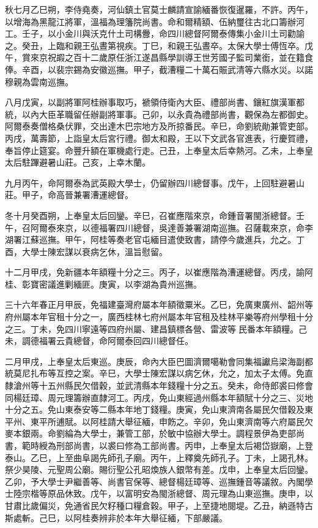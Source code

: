 \begin{pinyinscope}
秋七月乙巳朔，李侍堯奏，河仙鎮土官莫士麟請宣諭緬番恢復暹羅，不許。丙午，以增海為黑龍江將軍，溫福為理籓院尚書。命和爾精額、伍納璽往古北口籌辦河工。壬子，以小金川與沃克什土司構釁，命四川總督阿爾泰傳集小金川土司勸諭之。癸丑，上臨和親王弘晝第視疾。丁巳，和親王弘晝卒。太保大學士傅恆卒。戊午，賞來京祝嘏之百十二歲原任浙江遂昌縣學訓導王世芳國子監司業銜，並在籍食俸。辛酉，以裴宗錫為安徽巡撫。甲子，截漕糧二十萬石賑武清等六縣水災。以諾穆親為雲南巡撫。

八月戊寅，以副將軍阿桂辦事取巧，褫領侍衛內大臣、禮部尚書、鑲紅旗漢軍都統，以內大臣革職留任辦副將軍事。己卯，以永貴為禮部尚書，觀保為左都御史。阿爾泰奏僧格桑伏罪，交出達木巴宗地方及所掠番民。辛巳，命劉統勛兼管吏部。丙戌，萬壽節，上詣皇太后宮行禮。御太和殿，王以下文武各官進表，行慶賀禮，奉旨停止筵宴。命豐升額在軍機處行走。己丑，上奉皇太后幸熱河。乙未，上奉皇太后駐蹕避暑山莊。己亥，上幸木蘭。

九月丙午，命阿爾泰為武英殿大學士，仍留辦四川總督事。戊午，上回駐避暑山莊。甲子，命高晉兼署漕運總督。

冬十月癸酉朔，上奉皇太后回鑾。辛巳，召崔應階來京，命鍾音署閩浙總督。壬午，召阿爾泰來京，以德福署四川總督，吳達善兼署湖南巡撫。召薩載來京，命李湖署江蘇巡撫。甲午，阿桂等奏老官屯緬目遣使致書，請停今歲進兵，允之。丁酉，大學士陳宏謀以衰病乞休，溫旨慰留。

十二月甲戌，免新疆本年額糧十分之三。丙子，以崔應階為漕運總督。丙戌，諭阿桂、彰寶密議進剿緬匪。庚寅，以李湖為貴州巡撫。

三十六年春正月甲辰，免福建臺灣府屬本年額徵粟米。乙巳，免廣東廣州、韶州等府州屬本年官租十分之一，廣西桂林七府州屬本年官租及桂林平樂等府州學租十分之三。丁未，免四川寧遠等四府州屬、建昌鎮標各營、雷波等民番本年額糧。己未，調德福署云貴總督，命阿爾泰回四川總督任。

二月甲戌，上奉皇太后東巡。庚辰，命內大臣巴圖濟爾噶勒會同集福讞烏梁海副都統莫尼扎布等互控之案。辛巳，大學士陳宏謀以病乞休，允之，加太子太傅。免直隸滄州等十五州縣民欠借穀，並武清縣本年錢糧十分之五。癸未，命侍郎裘曰修會同楊廷璋、周元理籌辦直隸河工。丙戌，免山東經過州縣本年額賦十分之三、災地十分之五。免山東泰安等二縣本年地丁錢糧。庚寅，免山東濟南各屬民欠借穀及東平州、東平所逋賦。以阿桂請大舉征緬，申飭之。辛卯，免山東濟南等六府屬民欠麥本銀兩。命劉綸為大學士，兼管工部，於敏中協辦大學士。調程景伊為吏部尚書，範時綬為刑部尚書，以裘曰修為工部尚書。丙申，上奉皇太后褐岱嶽廟，上登泰山。乙巳，上至曲阜謁先師孔子廟。丙午，上釋奠先師孔子。丁未，上謁孔林。祭少昊陵、元聖周公廟。賜衍聖公孔昭煥族人銀幣有差。戊申，上奉皇太后回鑾。乙卯，予大學士尹繼善等、尚書官保等、總督楊廷璋等、巡撫鍾音等議敘。內閣學士陸宗楷等原品休致。戊午，以富明安為閩浙總督、周元理為山東巡撫。庚申，以甘肅比歲偏災，免通省民欠籽種口糧倉穀。甲子，上至捷地閱堤。乙丑，納遜特古斯處斬。己巳，以阿桂奏辨非於本年大舉征緬，下部嚴議。


\end{pinyinscope}
